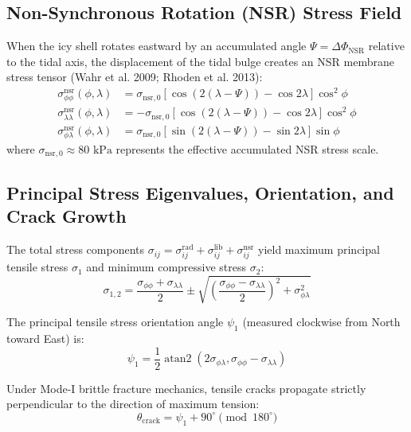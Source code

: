 \documentclass[11pt,a4paper]{article}
\begin{document}
\subsection{Non-Synchronous Rotation (NSR) Stress Field}
When the icy shell rotates eastward by an accumulated angle $\Psi = \Delta \Phi_{\text{NSR}}$ relative to the tidal axis, the displacement of the tidal bulge creates an NSR membrane stress tensor (Wahr et al. 2009; Rhoden et al. 2013):
\begin{align}
\sigma_{\phi\phi}^{\text{nsr}}(\phi, \lambda) &= \sigma_{\text{nsr},0} \left[ \cos(2(\lambda - \Psi)) - \cos 2\lambda \right] \cos^2\phi \\
\sigma_{\lambda\lambda}^{\text{nsr}}(\phi, \lambda) &= -\sigma_{\text{nsr},0} \left[ \cos(2(\lambda - \Psi)) - \cos 2\lambda \right] \cos^2\phi \\
\sigma_{\phi\lambda}^{\text{nsr}}(\phi, \lambda) &= \sigma_{\text{nsr},0} \left[ \sin(2(\lambda - \Psi)) - \sin 2\lambda \right] \sin\phi
\end{align}
where $\sigma_{\text{nsr},0} \approx 80\text{ kPa}$ represents the effective accumulated NSR stress scale.

\subsection{Principal Stress Eigenvalues, Orientation, and Crack Growth}
The total stress components $\sigma_{ij} = \sigma_{ij}^{\text{rad}} + \sigma_{ij}^{\text{lib}} + \sigma_{ij}^{\text{nsr}}$ yield maximum principal tensile stress $\sigma_1$ and minimum compressive stress $\sigma_2$:
\begin{equation}
\sigma_{1,2} = \frac{\sigma_{\phi\phi} + \sigma_{\lambda\lambda}}{2} \pm \sqrt{\left(\frac{\sigma_{\phi\phi} - \sigma_{\lambda\lambda}}{2}\right)^2 + \sigma_{\phi\lambda}^2}
\end{equation}

The principal tensile stress orientation angle $\psi_1$ (measured clockwise from North toward East) is:
\begin{equation}
\psi_1 = \frac{1}{2} \operatorname{atan2}(2\sigma_{\phi\lambda}, \sigma_{\phi\phi} - \sigma_{\lambda\lambda})
\end{equation}

Under Mode-I brittle fracture mechanics, tensile cracks propagate strictly perpendicular to the direction of maximum tension:
\begin{equation}
\theta_{\text{crack}} = \psi_1 + 90^\circ \pmod{180^\circ}
\end{equation}
\end{document}
